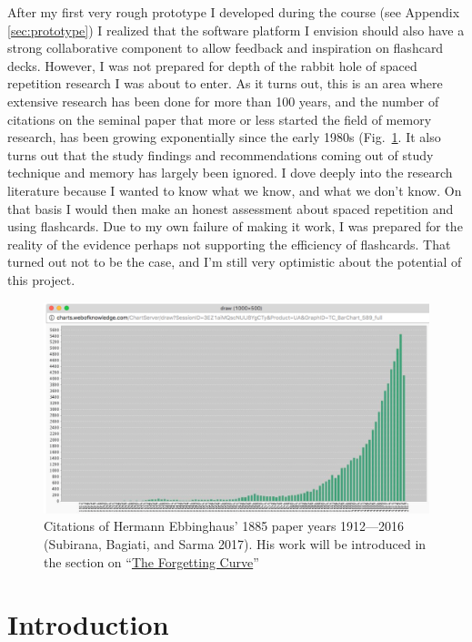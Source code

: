 After my first very rough prototype I developed during the course (see
Appendix \ref{sec:prototype}) I realized that the software platform I
envision should also have a strong collaborative component to allow
feedback and inspiration on flashcard decks. However, I was not prepared
for depth of the rabbit hole of spaced repetition research I was about
to enter. As it turns out, this is an area where extensive research has
been done for more than 100 years, and the number of citations on the
seminal paper that more or less started the field of memory research,
has been growing exponentially since the early 1980s
(Fig.~\ref{fig:ebbinghaus-citations}. It also turns out that the study
findings and recommendations coming out of study technique and memory
has largely been ignored. I dove deeply into the research literature
because I wanted to know what we know, and what we don't know. On that
basis I would then make an honest assessment about spaced repetition and
using flashcards. Due to my own failure of making it work, I was
prepared for the reality of the evidence perhaps not supporting the
efficiency of flashcards. That turned out not to be the case, and I'm
still very optimistic about the potential of this project.

\begin{figure}
\centering
\includegraphics{assets/ebbinghaus-citations.png}
\caption{Citations of Hermann Ebbinghaus' 1885 paper years 1912---2016
(Subirana, Bagiati, and Sarma 2017). His work will be introduced in the
section on ``\protect\hyperlink{the-forgetting-curve}{The Forgetting
Curve}''}\label{fig:ebbinghaus-citations}
\end{figure}

\newpage

\section{Introduction}\label{introduction}

